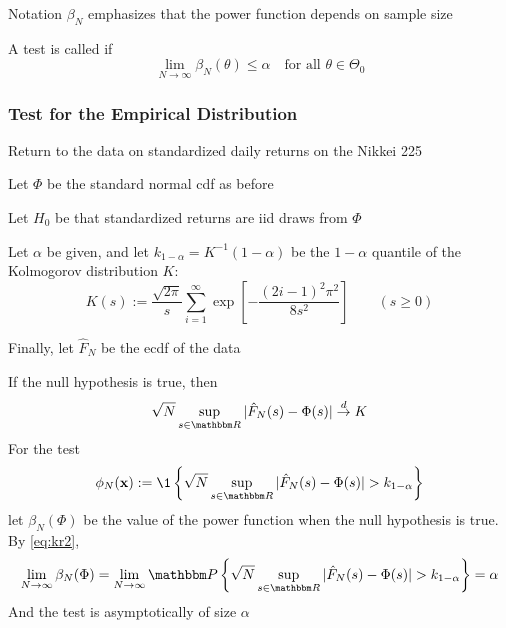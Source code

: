 \begin{frame}

    \vspace{2em}
    Notation $\beta_N$ emphasizes that the power function depends on sample size
    
    A test is
    called  if
    \begin{equation*}
        \label{eq:asmposa}
        \lim_{N \to \infty}
        \beta_N(\theta) \leq \alpha
        \quad \text{for all } \theta \in \Theta_0
    \end{equation*}
    
\end{frame}

\begin{frame}\frametitle{Test for the Empirical Distribution}

    \vspace{2em}
    Return to the data on standardized daily
    returns on the Nikkei 225
    
    \vspace{.7em}
    Let $\Phi$ be
    the standard normal {\sc cdf} as before
    
    Let $H_0$ be that standardized
    returns are {\sc iid} draws from $\Phi$
    
    Let $\alpha$ be given, and let
    $k_{1-\alpha} = K^{-1}(1-\alpha)$ be the $1-\alpha$ quantile of the Kolmogorov
    distribution $K$: 
    \begin{equation*}
    K(s) := \frac{\sqrt{2 \pi}}{s} \sum_{i=1}^{\infty}
    \exp \left[ - \frac{(2 i - 1)^2 \pi^2}{8 s^2} \right]
    \qquad (s \geq 0)
    \end{equation*}

    Finally, let $\hat F_N$ be the
    {\sc ecdf} of the data
    
\end{frame}

\begin{frame}
    
    \vspace{2em}
    If the null hypothesis is true, then
    \begin{equation}
        \label{eq:kr2}
        \sqrt{N} \sup_{s \in \RR} |\hat F_N(s) - \Phi(s)| \tod K
    \end{equation}
    For the test
    \begin{equation*}
        \phi_N(\boldx) 
        := \1 \left\{ 
               \sqrt{N} \sup_{s \in \RR} |\hat F_N(s) - \Phi(s)| > k_{1-\alpha}
            \right\}
    \end{equation*}
    let $\beta_N(\Phi)$ be the value of the power function when the null hypothesis is
    true. By \eqref{eq:kr2},
    \begin{equation*}
        \lim_{N \to \infty} \beta_N(\Phi) 
        = \lim_{N \to \infty} 
            \PP \left\{ 
                \sqrt{N}\sup_{s \in \RR} |\hat F_N(s) - \Phi(s)| > k_{1-\alpha}
            \right\}
        = \alpha
    \end{equation*}
    And the test is asymptotically of size
    $\alpha$
    
\end{frame}


